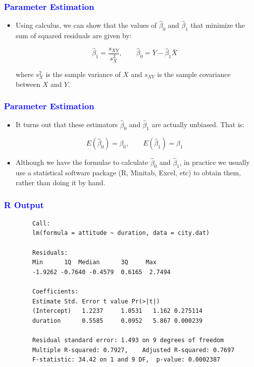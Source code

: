 \documentclass[12pt]{beamer}
\begin{document}
\begin{frame}
	\frametitle{\textcolor{blue}{Parameter Estimation}}
	
	\begin{itemize}[label={\color{blue}$\blacktriangleright$}]
		\item Using calculus, we can show that the values of $\hat{\beta}_0$ and $\hat{\beta}_1$ that minimize the sum of squared residuals are given by:
		
		\[
		\hat{\beta}_1 = \frac{s_{XY}}{s^2_X}, \qquad \hat{\beta}_0 = \bar{Y} - \hat{\beta}_1\bar{X}
		\]
		
		where $s^2_X$ is the sample variance of $X$ and $s_{XY}$ is the sample covariance between $X$ and $Y$.
	\end{itemize}
	
\end{frame}
\begin{frame}
	\frametitle{\textcolor{blue}{Parameter Estimation}}
	
	\begin{itemize}[label={\color{blue}$\blacktriangleright$}]
		\item It turns out that these estimators $\hat{\beta}_0$ and $\hat{\beta}_1$ are actually unbiased. That is:
		
		\[
		E(\hat{\beta}_0) = \beta_0, \qquad E(\hat{\beta}_1) = \beta_1
		\]
		
		\item Although we have the formulae to calculate $\hat{\beta}_0$ and $\hat{\beta}_1$, in practice we usually use a statistical software package (R, Minitab, Excel, etc) to obtain them, rather than doing it by hand.
	\end{itemize}
	
\end{frame}
\begin{frame}[fragile]
	\frametitle{\textcolor{blue}{R Output}}
	
	\begin{verbatim}
		Call:
		lm(formula = attitude ~ duration, data = city.dat)
		
		Residuals:
		Min      1Q  Median      3Q     Max 
		-1.9262 -0.7640 -0.4579  0.6165  2.7494 
		
		Coefficients:
		Estimate Std. Error t value Pr(>|t|)
		(Intercept)   1.2237     1.0531   1.162 0.275114
		duration      0.5585     0.0952   5.867 0.000239
		
		Residual standard error: 1.493 on 9 degrees of freedom
		Multiple R-squared: 0.7927,    Adjusted R-squared: 0.7697
		F-statistic: 34.42 on 1 and 9 DF,  p-value: 0.0002387
	\end{verbatim}
	
\end{frame}
\end{document}
